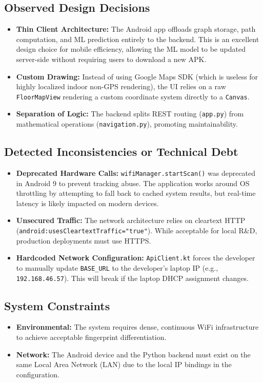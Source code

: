 \documentclass[11pt,a4paper]{article}
\begin{document}
\subsection{Observed Design Decisions}
\begin{itemize}
\item \textbf{Thin Client Architecture:} The Android app offloads graph storage, path computation, and ML prediction entirely to the backend. This is an excellent design choice for mobile efficiency, allowing the ML model to be updated server-side without requiring users to download a new APK.
\item \textbf{Custom Drawing:} Instead of using Google Maps SDK (which is useless for highly localized indoor non-GPS rendering), the UI relies on a raw \texttt{FloorMapView} rendering a custom coordinate system directly to a \texttt{Canvas}.
\item \textbf{Separation of Logic:} The backend splits REST routing (\texttt{app.py}) from mathematical operations (\texttt{navigation.py}), promoting maintainability.
\end{itemize}
\subsection{Detected Inconsistencies or Technical Debt}
\begin{itemize}
\item \textbf{Deprecated Hardware Calls:} \texttt{wifiManager.startScan()} was deprecated in Android 9 to prevent tracking abuse. The application works around OS throttling by attempting to fall back to cached system results, but real-time latency is likely impacted on modern devices.
\item \textbf{Unsecured Traffic:} The network architecture relies on cleartext HTTP \\(\texttt{android:usesCleartextTraffic="true"}). While acceptable for local R\&D, production deployments must use HTTPS.
\item \textbf{Hardcoded Network Configuration:} \texttt{ApiClient.kt} forces the developer to manually update \texttt{BASE\_URL} to the developer's laptop IP (e.g., \texttt{192.168.46.57}). This will break if the laptop DHCP assignment changes.
\end{itemize}
\subsection{System Constraints}
\begin{itemize}
\item \textbf{Environmental:} The system requires dense, continuous WiFi infrastructure to achieve acceptable fingerprint differentiation.
\item \textbf{Network:} The Android device and the Python backend must exist on the same Local Area Network (LAN) due to the local IP bindings in the configuration.
\end{itemize}
\end{document}
